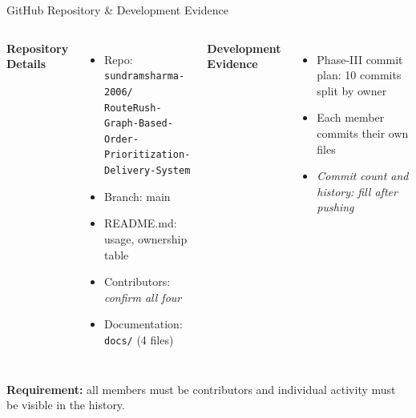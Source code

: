 \documentclass[aspectratio=169,11pt]{beamer}
\newcommand{\todo}[1]{\textit{\color{red}#1}}
\begin{document}
\begin{frame}{GitHub Repository \& Development Evidence}
\footnotesize
\begin{columns}[T,totalwidth=\textwidth]
\textbf{\color{GEUBlue}Repository Details}
\begin{itemize}\itemsep3pt
    \item Repo: \texttt{sundramsharma-2006/}\\\texttt{RouteRush-Graph-Based-Order-}\\\texttt{Prioritization-Delivery-System}
    \item Branch: main
    \item README.md: usage, ownership table
    \item Contributors: \todo{confirm all four}
    \item Documentation: \texttt{docs/} (4 files)
\end{itemize}
\textbf{\color{GEUBlue}Development Evidence}
\begin{itemize}\itemsep3pt
    \item Phase-III commit plan: 10 commits split by owner
    \item Each member commits their own files
    \item \todo{Commit count and history: fill after pushing}
\end{itemize}
\end{columns}
\vfill
\begin{center}
\colorbox{GEULightBlue}{\parbox{.88\textwidth}{\centering
\textbf{Requirement:} all members must be contributors and individual activity must be visible in the history.}}
\end{center}
\end{frame}
\end{document}
